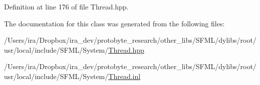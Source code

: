 Definition at line 176 of file Thread.\-hpp.



The documentation for this class was generated from the following files\-:\begin{DoxyCompactItemize}
\item 
/\-Users/ira/\-Dropbox/ira\-\_\-dev/protobyte\-\_\-research/other\-\_\-libs/\-S\-F\-M\-L/dylibs/root/usr/local/include/\-S\-F\-M\-L/\-System/\hyperlink{_thread_8hpp}{Thread.\-hpp}\item 
/\-Users/ira/\-Dropbox/ira\-\_\-dev/protobyte\-\_\-research/other\-\_\-libs/\-S\-F\-M\-L/dylibs/root/usr/local/include/\-S\-F\-M\-L/\-System/\hyperlink{_thread_8inl}{Thread.\-inl}\end{DoxyCompactItemize}
